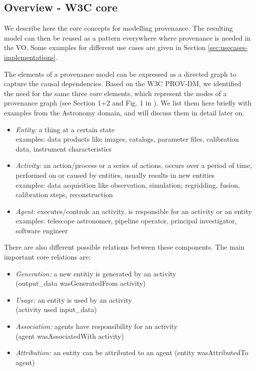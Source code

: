 \subsection{Overview - W3C core}\label{sec:w3c_overview}
We describe here the core concepts for modelling provenance. The resulting model can then be reused as a pattern everywhere where provenance
is needed in the VO. Some examples for different use cases are given in Section \ref{sec:usecases-implementations}.

The elements of a provenance model can be expressed as a directed graph to capture the causal dependencies. 
Based on the W3C PROV-DM, we identified the need for the same three core elements, which represent the nodes of a provenance graph
(see Section 1+2 and Fig. 1 in \cite{std:W3CProvDM}). We list them here briefly with examples from the Astronomy domain, and will discuss them in detail later on.

\begin{itemize}
\item \emph{Entity:} a thing at a certain state\\
    examples: data products like images, catalogs, parameter files, calibration data, instrument characteristics

\item \emph{Activity:} an action/process or a series of actions, occurs over a period of time, performed on or caused by entities, usually results in new entities\\
    examples: data acquisition like observation, simulation; regridding, fusion, calibration steps, reconstruction

\item \emph{Agent:} executes/controls an activity, is responsible for an activity or an entity\\
    examples: telescope astronomer, pipeline operator, principal investigator, software engineer

\end{itemize}

\noindent
There are also different possible relations between these components. The main important core relations are:
\begin{itemize}
\item \emph{Generation:} a new entitiy is generated by an activity\\
        (output\_data wasGeneratedFrom activity)
\item \emph{Usage:} an entity is used by an activity\\
        (activity used input\_data)
\item \emph{Association:} agents have responsibility for an activity\\
        (agent wasAssociatedWith activity)
\item \emph{Attribution:} an entity can be attributed to an agent (entity wasAttributedTo agent)
\end{itemize}

